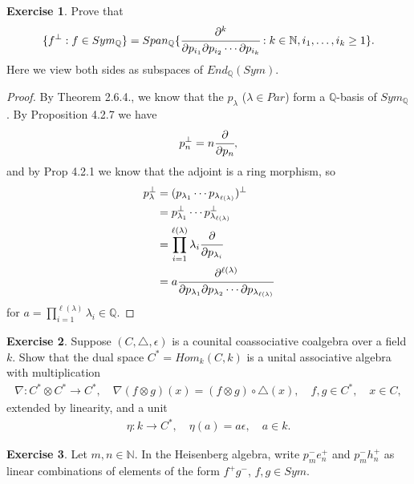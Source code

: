 \documentclass[8pt]{extarticle}
\newcommand{\set}[1]{\{#1\}}
\newcommand{\N}{\mathbb{N}}
\newcommand{\Q}{\mathbb{Q}}
\newcommand{\<}{\langle}
\renewcommand{\>}{\rangle}
\theoremstyle{definition}
\newtheorem{exercise}{Exercise}
\begin{document}
\begin{exercise}
  Prove that
  \begin{align*}
    \set{f^{\perp} : f \in Sym_\Q} = Span_{\Q}\set{\cfrac{\partial^k}{\partial p_{i_1} \partial p_{i_2} \cdots \partial p_{i_k}} : k \in \N, i_1, \dots, i_k \geq 1 }.
  \end{align*}
  Here we view both sides as subspaces of $End_{\Q}(Sym)$.
\end{exercise}

\begin{proof}
  By Theorem 2.6.4., we know that the $p_\lambda$ ($\lambda \in Par$) form a $\Q$-basis of $Sym_\Q$. By Proposition 4.2.7 we have
  \begin{align*}
    p_n^{\perp} = n \cfrac{\partial}{\partial p_n},
  \end{align*}
  and by Prop 4.2.1 we know that the adjoint is a ring morphism, so
  \begin{align*}
    p_{\lambda}^{\perp} &=
    (p_{\lambda_1} \cdots p_{\lambda_{\ell(\lambda)}})^{\perp} \\
    &= p_{\lambda_1}^{\perp} \cdots p_{\lambda_{\ell(\lambda)}}^{\perp} \\
    &= \prod_{i=1}^{\ell(\lambda)} \lambda_i \cfrac{\partial}{\partial p_{\lambda_i}} \\
    &= a \cfrac{\partial^{\ell(\lambda)}}{\partial p_{\lambda_1}\partial p_{\lambda_2} \cdots \partial p_{\lambda_{\ell(\lambda)}}}
  \end{align*}
  for $a = \prod\limits_{i=1}^{\ell(\lambda)} \lambda_i \in \Q$.
\end{proof}

\begin{exercise}
  Suppose $(C, \triangle, \epsilon)$ is a counital coassociative coalgebra over a field $k$. Show that the dual space $C^* = Hom_k(C,k)$ is a unital associative algebra with multiplication
  \begin{align*}
    \nabla: C^* \otimes C^* \to C^*, \quad \nabla(f \otimes g)(x) = (f \otimes g) \circ \triangle(x), \quad f, g \in C^*, \quad x \in C,
  \end{align*}
  extended by linearity, and a unit
  \begin{align*}
    \eta: k \to C^* , \quad \eta(a) = a\epsilon, \quad a \in k.
  \end{align*}
\end{exercise}

\begin{exercise}
  Let $m,n \in \N$. In the Heisenberg algebra, write $p_m^-e_n^+$ and $p_m^-h_n^+$ as linear combinations of elements of the form $f^+g^-$, $f,g \in Sym$.
\end{exercise}
\end{document}
